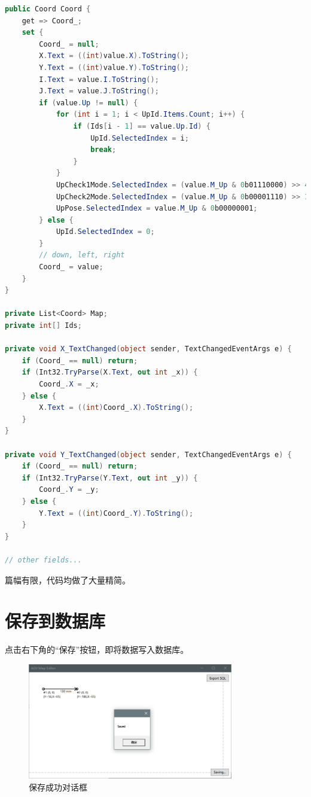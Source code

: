 \begin{lstlisting}[language=cs]
public Coord Coord {
    get => Coord_;
    set {
        Coord_ = null;
        X.Text = ((int)value.X).ToString();
        Y.Text = ((int)value.Y).ToString();
        I.Text = value.I.ToString();
        J.Text = value.J.ToString();
        if (value.Up != null) {
            for (int i = 1; i < UpId.Items.Count; i++) {
                if (Ids[i - 1] == value.Up.Id) {
                    UpId.SelectedIndex = i;
                    break;
                }
            }
            UpCheck1Mode.SelectedIndex = (value.M_Up & 0b01110000) >> 4;
            UpCheck2Mode.SelectedIndex = (value.M_Up & 0b00001110) >> 1;
            UpPose.SelectedIndex = value.M_Up & 0b00000001;
        } else {
            UpId.SelectedIndex = 0;
        }
        // down, left, right
        Coord_ = value;
    }
}

private List<Coord> Map;
private int[] Ids;

private void X_TextChanged(object sender, TextChangedEventArgs e) {
    if (Coord_ == null) return;
    if (Int32.TryParse(X.Text, out int _x)) {
        Coord_.X = _x;
    } else {
        X.Text = ((int)Coord_.X).ToString();
    }
}

private void Y_TextChanged(object sender, TextChangedEventArgs e) {
    if (Coord_ == null) return;
    if (Int32.TryParse(Y.Text, out int _y)) {
        Coord_.Y = _y;
    } else {
        Y.Text = ((int)Coord_.Y).ToString();
    }
}

// other fields...
\end{lstlisting}

篇幅有限，代码均做了大量精简。

\section{保存到数据库}

点击右下角的``保存''按钮，即将数据写入数据库。

\begin{figure}[H]
  \centering
  \includegraphics[width=0.8\textwidth]{assets/save.png}
  \caption{保存成功对话框}
  \label{fig:save}
\end{figure}

